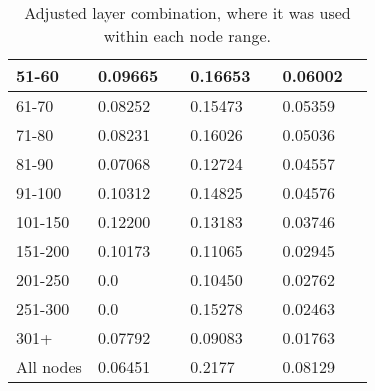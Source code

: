\begin{table*}[h!]
\begin{tabular}{|l|l|l||l|l||l|l|}
        51-60     & 0.09665                                 &                                & 0.16653                          &                  & 0.06002       &                  \\ \hline
        61-70     & 0.08252                                 &                                & 0.15473                          &                  & 0.05359       &                  \\ \hline
        71-80     & 0.08231                                 &                                & 0.16026                          &                  & 0.05036       &                  \\ \hline
        81-90     & 0.07068                                 &                                & 0.12724                          &                  & 0.04557       &                  \\ \hline
        91-100    & 0.10312                                 &                                & 0.14825                          &                  & 0.04576       &                  \\ \hline
        101-150   & 0.12200                                 &                                & 0.13183                          &                  & 0.03746       &                  \\ \hline
        151-200   & 0.10173                                 &                                & 0.11065                          &                  & 0.02945       &                  \\ \hline
        201-250   & 0.0                                     &                                & 0.10450                          &                  & 0.02762       &                  \\ \hline
        251-300   & 0.0                                     &                                & 0.15278                          &                  & 0.02463       &                  \\ \hline
        301+      & 0.07792                                 &                                & 0.09083                          &                  & 0.01763       &                  \\ \hline
        All nodes & 0.06451                                 &                                & 0.2177                           &                  & 0.08129       &                  \\ \hline
    \end{tabular}
    \caption{Adjusted layer combination, where it was used within each node range.}
    \label{tab:recall-adjusted-layer-bad-performance}
\end{table*}

